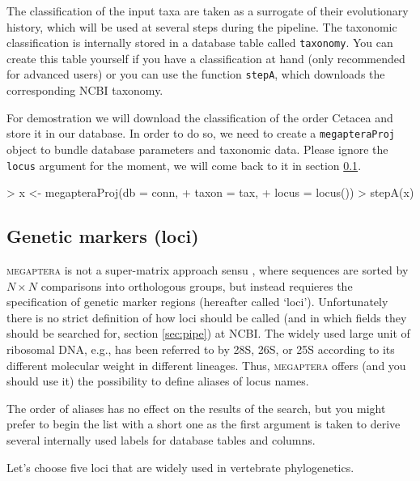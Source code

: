 \documentclass{article}
\begin{document}

The classification of the input taxa are taken as a surrogate of their evolutionary history, which will be used at several steps during the pipeline. The taxonomic classification is internally stored in a database table called \texttt{taxonomy}. You can create this table yourself if you have a classification at hand (only recommended for advanced users) or you can use the function \texttt{stepA}, which downloads the corresponding NCBI taxonomy. 

For demostration we will download the classification of the order Cetacea and store it in our database. In order to do so, we need to create a \texttt{megapteraProj} object to bundle database parameters and taxonomic data. Please ignore the \texttt{locus} argument for the moment, we will come back to it in section \ref{subsec:loci}.

\begin{Schunk}
\begin{Sinput}
> x <- megapteraProj(db = conn,
+                    taxon = tax,
+                    locus = locus())
> stepA(x)
\end{Sinput}
\end{Schunk}


\subsection{Genetic markers (loci)}\label{subsec:loci}

\textsc{megaptera} is not a super-matrix approach sensu \citet{smithdonoghue2009}, where sequences are sorted by $N \times N$ comparisons into orthologous groups, but instead requieres the specification of genetic marker regions (hereafter called `loci'). Unfortunately there is no strict definition of how loci should be called (and in which fields they should be searched for, section \ref{sec:pipe}) at NCBI. The widely used large unit of ribosomal DNA, e.g., has been referred to by 28S, 26S, or 25S according to its different molecular weight in different lineages. Thus, \textsc{megaptera} offers (and you should use it) the possibility to define aliases of locus names.

The order of aliases has no effect on the results of the search, but you might prefer to begin the list with a short one as the first argument is taken to derive several internally used labels for database tables and columns.

Let's choose five loci that are widely used in vertebrate phylogenetics.
\end{document}
